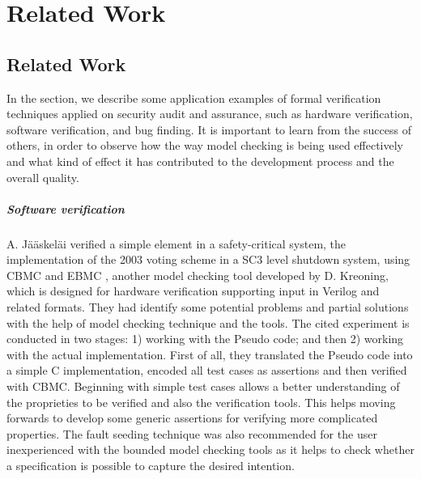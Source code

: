 \chapter{Related Work}

\section{Related Work}
In the section, we describe some application examples of formal verification techniques applied on security audit and assurance, such as hardware verification, software verification, and bug finding. It is important to learn from the success of others, in order to observe how the way model checking is being used effectively and what kind of effect it has contributed to the development process and the overall quality.

\paragraph{Software verification}
A. J{\"a}{\"a}skel{\"a}i \cite{jskelinen_et_al:OASIcs:2012:3589} verified a simple element in a safety-critical system, the implementation of the 2003 voting scheme in a SC3 level shutdown system, using CBMC and EBMC \cite{the_embc_user_manual}, another model checking tool developed by D. Kreoning, which is designed for hardware verification supporting input in Verilog and related formats. They had identify some potential problems and partial solutions with the help of model checking technique and the tools. The cited experiment is conducted in two stages: 1) working with the Pseudo code; and then 2) working with the actual implementation. First of all, they translated the Pseudo code into a simple C implementation, encoded all test cases as assertions and then verified with CBMC. Beginning with simple test cases allows a better understanding of the proprieties to be verified and also the verification tools. This helps moving forwards to develop some generic assertions for verifying more complicated properties. The fault seeding technique was also recommended for the user inexperienced with the bounded model checking tools as it helps to check whether a specification is possible to capture the desired intention. 


